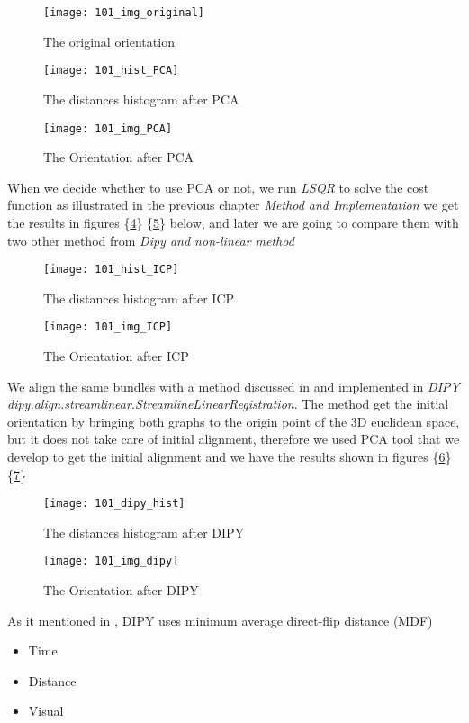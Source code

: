\documentclass[../structure.tex]{subfiles}
\begin{document}
\begin{figure}[h!]
\centering
\texttt{[image: 101\_img\_original]}
\captionsetup{justification=centering}
\caption{The original orientation}
\label{fig:img_original}
\end{figure}
\pagebreak
\begin{figure}[h!]
\centering
\texttt{[image: 101\_hist\_PCA]}
\captionsetup{justification=centering}
\caption{The distances histogram after PCA}
\label{fig:hist_PCA}
\end{figure}

\begin{figure}[h!]
\centering
\texttt{[image: 101\_img\_PCA]}
\captionsetup{justification=centering}
\caption{The Orientation after PCA}
\label{fig:img_PCA}
\end{figure}
\pagebreak
When we decide whether to use PCA or not, we run \textit{LSQR} to solve the cost function as illustrated in the previous chapter \textit{Method and Implementation} we get the results in figures \{\ref{fig:hist_ICP}\} \{\ref{fig:img_ICP}\} below, and later we are going to compare them with two other method from \textit{Dipy and non-linear method}

\begin{figure}[h!]
\centering
\texttt{[image: 101\_hist\_ICP]}
\captionsetup{justification=centering}
\caption{The distances histogram after ICP}
\label{fig:hist_ICP}
\end{figure}

\begin{figure}[h!]
\centering
\texttt{[image: 101\_img\_ICP]}
\captionsetup{justification=centering}
\caption{The Orientation after ICP}
\label{fig:img_ICP}
\end{figure}
\pagebreak
We align the same bundles with a method discussed in \cite{ODonnell2012} and implemented in \textit{DIPY dipy.align.streamlinear.StreamlineLinearRegistration}. The method get the initial orientation by bringing both graphs to the origin point of the 3D euclidean space, but it does not take care of initial alignment, therefore we used PCA tool that we develop to get the initial alignment and we have the results shown in figures \{\ref{fig:dipy_hist}\} \{\ref{fig:img_dipy}\}

\begin{figure}[h!]
\centering
\texttt{[image: 101\_dipy\_hist]}
\captionsetup{justification=centering}
\caption{The distances histogram after DIPY}
\label{fig:dipy_hist}
\end{figure}

\begin{figure}[h!]
\centering
\texttt{[image: 101\_img\_dipy]}
\captionsetup{justification=centering}
\caption{The Orientation after DIPY}
\label{fig:img_dipy}
\end{figure}

As it mentioned in \cite{ODonnell2012}, DIPY uses minimum average direct-flip distance (MDF)
\begin{itemize}
\item Time
\item Distance 
\item Visual
\end{itemize}
\end{document}
